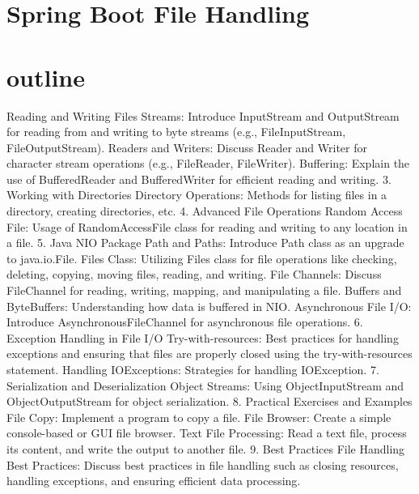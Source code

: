 \documentclass[a4paper, 12pt]{report}
\begin{document}
\section{Spring Boot File Handling}





\section{outline}

 Reading and Writing Files
Streams: Introduce InputStream and OutputStream for reading from and writing to byte streams (e.g., FileInputStream, FileOutputStream).
Readers and Writers: Discuss Reader and Writer for character stream operations (e.g., FileReader, FileWriter).
Buffering: Explain the use of BufferedReader and BufferedWriter for efficient reading and writing.
3. Working with Directories
Directory Operations: Methods for listing files in a directory, creating directories, etc.
4. Advanced File Operations
Random Access File: Usage of RandomAccessFile class for reading and writing to any location in a file.
5. Java NIO Package
Path and Paths: Introduce Path class as an upgrade to java.io.File.
Files Class: Utilizing Files class for file operations like checking, deleting, copying, moving files, reading, and writing.
File Channels: Discuss FileChannel for reading, writing, mapping, and manipulating a file.
Buffers and ByteBuffers: Understanding how data is buffered in NIO.
Asynchronous File I/O: Introduce AsynchronousFileChannel for asynchronous file operations.
6. Exception Handling in File I/O
Try-with-resources: Best practices for handling exceptions and ensuring that files are properly closed using the try-with-resources statement.
Handling IOExceptions: Strategies for handling IOException.
7. Serialization and Deserialization
Object Streams: Using ObjectInputStream and ObjectOutputStream for object serialization.
8. Practical Exercises and Examples
File Copy: Implement a program to copy a file.
File Browser: Create a simple console-based or GUI file browser.
Text File Processing: Read a text file, process its content, and write the output to another file.
9. Best Practices
File Handling Best Practices: Discuss best practices in file handling such as closing resources, handling exceptions, and ensuring efficient data processing.


\printbibliography
\end{document}
